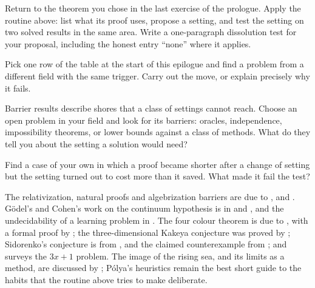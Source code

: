 \begin{refsection}
\begin{exercises}
\item \research Return to the theorem you chose in the last exercise of the prologue. Apply the routine above: list what its proof uses, propose a setting, and test the setting on two solved results in the same area. Write a one-paragraph dissolution test for your proposal, including the honest entry ``none'' where it applies.
\item \research Pick one row of the table at the start of this epilogue and find a problem from a different field with the same trigger. Carry out the move, or explain precisely why it fails.
\item \research Barrier results describe shores that a class of settings cannot reach. Choose an open problem in your field and look for its barriers: oracles, independence, impossibility theorems, or lower bounds against a class of methods. What do they tell you about the setting a solution would need?
\item \research Find a case of your own in which a proof became shorter after a change of setting but the setting turned out to cost more than it saved. What made it fail the test?
\end{exercises}

\notesandrefs

The relativization, natural proofs and algebrization barriers are due to \textcite{BakerGillSolovay1975}, \textcite{RazborovRudich1997} and \textcite{AaronsonWigderson2009}. G\"odel's and Cohen's work on the continuum hypothesis is in \textcite{Godel1940} and \textcite{Cohen1963}, and the undecidability of a learning problem in \textcite{BenDavidEtAl2019}. The four colour theorem is due to \textcite{AppelHaken1977}, with a formal proof by \textcite{Gonthier2008}; the three-dimensional Kakeya conjecture was proved by \textcite{WangZahl2025}; Sidorenko's conjecture is from \textcite{Sidorenko1993}, and the claimed counterexample from \textcite{OpenAI2026}; and \textcite{Lagarias1985} surveys the $3x+1$ problem. The image of the rising sea, and its limits as a method, are discussed by \textcite{McLarty2007}; P\'olya's heuristics \parencite{Polya1945} remain the best short guide to the habits that the routine above tries to make deliberate.

\printchapterbib
\end{refsection}
